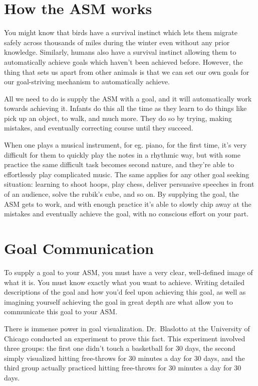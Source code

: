 \documentclass[
]{book}
\begin{document}
\hypertarget{how-the-asm-works}{%
\section{How the ASM works}\label{how-the-asm-works}}

You might know that birds have a survival instinct which lets them migrate safely across thousands of miles during the winter even without any prior knowledge. Similarly, humans also have a survival instinct allowing them to automatically achieve goals which haven't been achieved before. However, the thing that sets us apart from other animals is that we can set our own goals for our goal-striving mechanism to automatically achieve.

All we need to do is supply the ASM with a goal, and it will automatically work towards achieving it. Infants do this all the time as they learn to do things like pick up an object, to walk, and much more. They do so by trying, making mistakes, and eventually correcting course until they succeed.

When one plays a musical instrument, for eg. piano, for the first time, it's very difficult for them to quickly play the notes in a rhythmic way, but with some practice the same difficult task becomes second nature, and they're able to effortlessly play complicated music. The same applies for any other goal seeking situation: learning to shoot hoops, play chess, deliver persuasive speeches in front of an audience, solve the rubik's cube, and so on. By supplying the goal, the ASM gets to work, and with enough practice it's able to slowly chip away at the mistakes and eventually achieve the goal, with no conscious effort on your part.

\hypertarget{goal-communication}{%
\section{Goal Communication}\label{goal-communication}}

To supply a goal to your ASM, you must have a very clear, well-defined image of what it is. You must know exactly what you want to achieve. Writing detailed descriptions of the goal and how you'd feel upon achieving this goal, as well as imagining yourself achieving the goal in great depth are what allow you to communicate this goal to your ASM.

There is immense power in goal visualization. Dr.~Blaslotto at the University of Chicago conducted an experiment to prove this fact. This experiment involved three groups: the first one didn't touch a basketball for 30 days, the second simply visualized hitting free-throws for 30 minutes a day for 30 days, and the third group actually practiced hitting free-throws for 30 minutes a day for 30 days.
\end{document}
